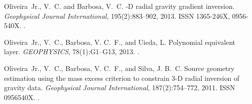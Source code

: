 \begin{thebibliography}{9}
Oliveira~Jr., V.~C. and Barbosa, V.~C.
-{D} radial gravity gradient inversion.
\newblock \emph{Geophysical Journal International}, 195(2):883--902, 2013.
\newblock ISSN 1365-246X, 0956-540X.
\newblock {}.

Oliveira~Jr., V.~C., Barbosa, V. C.~F., and Uieda, L.
\newblock Polynomial equivalent layer.
\newblock \emph{GEOPHYSICS}, 78(1):G1--G13, 2013.
\newblock {}.

Oliveira~Jr., V.~C., Barbosa, V. C.~F., and Silva, J. B.~C.
\newblock Source geometry estimation using the mass excess criterion to
  constrain 3-{D} radial inversion of gravity data.
\newblock \emph{Geophysical Journal International}, 187(2):754--772, 2011.
\newblock ISSN 0956540X.
\newblock {}.

\end{thebibliography}
